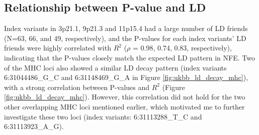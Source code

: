     \subsection{Relationship between P-value and LD} \label{sec:ukbb_postgwas}
  Index variants in 3p21.1, 9p21.3 and 11p15.4 had a large number of LD friends (N=63, 66, and 49, respectively), and the P-values for each index variants' LD friends were highly correlated with $R^{2}$ ($\rho$ = 0.98, 0.74, 0.83, respectively), indicating that the P-values closely match the expected LD pattern in
  NFE. Two of the MHC loci also showed a similar LD decay pattern (index variants 6:31044486\_G\_C and 6:31148469\_G\_A in Figure \ref{fig:ukbb_ld_decay_mhc}), with a strong correlation between P-values and $R^{2}$ (Figure \ref{fig:ukbb_ld_decay_mhc}). However, this correlation did not hold for the two other overlapping MHC loci mentioned earlier, which motivated me to further investigate these two loci (index variants: 6:31113288\_T\_C and 6:31113923\_A\_G).
  
